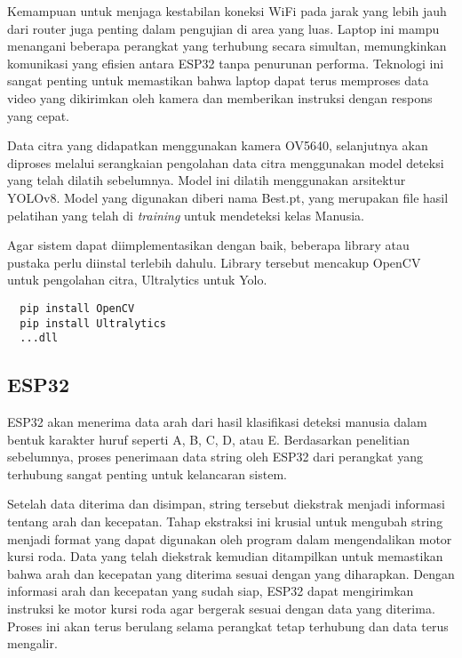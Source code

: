 Kemampuan untuk menjaga kestabilan koneksi WiFi pada jarak yang lebih jauh dari router juga penting dalam pengujian di area yang luas. Laptop ini mampu menangani beberapa perangkat yang terhubung secara simultan, memungkinkan komunikasi yang efisien antara ESP32 tanpa penurunan performa. Teknologi ini sangat penting untuk memastikan bahwa laptop dapat terus memproses data video yang dikirimkan oleh kamera dan memberikan instruksi dengan respons yang cepat.

Data citra yang didapatkan menggunakan kamera OV5640, selanjutnya akan diproses melalui serangkaian pengolahan data citra menggunakan model deteksi yang telah dilatih sebelumnya. Model ini dilatih menggunakan arsitektur YOLOv8. Model yang digunakan diberi nama Best.pt, yang merupakan file hasil pelatihan yang telah di \emph{training} untuk mendeteksi kelas Manusia.

Agar sistem dapat diimplementasikan dengan baik, beberapa library atau pustaka perlu diinstal terlebih dahulu. Library tersebut mencakup OpenCV untuk pengolahan citra, Ultralytics untuk Yolo.

\begin{lstlisting}
  pip install OpenCV
  pip install Ultralytics
  ...dll
\end{lstlisting}

\subsection{ESP32}
\label{subsec:ESP32}
ESP32 akan menerima data arah dari hasil klasifikasi deteksi manusia dalam bentuk karakter huruf seperti A, B, C, D, atau E. Berdasarkan penelitian sebelumnya, proses penerimaan data string oleh ESP32 dari perangkat yang terhubung sangat penting untuk kelancaran sistem.

Setelah data diterima dan disimpan, string tersebut diekstrak menjadi informasi tentang arah dan kecepatan. Tahap ekstraksi ini krusial untuk mengubah string menjadi format yang dapat digunakan oleh program dalam mengendalikan motor kursi roda. Data yang telah diekstrak kemudian ditampilkan untuk memastikan bahwa arah dan kecepatan yang diterima sesuai dengan yang diharapkan. Dengan informasi arah dan kecepatan yang sudah siap, ESP32 dapat mengirimkan instruksi ke motor kursi roda agar bergerak sesuai dengan data yang diterima. Proses ini akan terus berulang selama perangkat tetap terhubung dan data terus mengalir.

